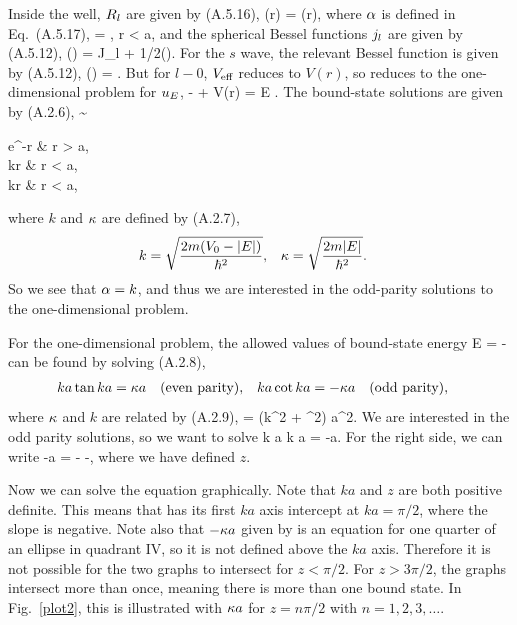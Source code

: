 \begin{solution}
	Inside the well, $R_l$ are given by (A.5.16),
	\beq
		\Rl(r) = \constant \jl(\alp r),
	\eeq
	where $\alpha$ is defined in Eq.~(A.5.17),
	\beq
		\alp = , \quad r < a,
	\eeq
	\clearpage
	and the spherical Bessel functions $j_l$ are given by (A.5.12),
	\beq
		\jl(\rho) = \sqrt{\frac{\pi}{2\rho}} J_{l + 1/2}(\rho).
	\eeq
	For the $s$ wave, the relevant Bessel function is given by (A.5.12),
	\beqn \label{jo}
		\jo(\rho) = \frac{\sin\rho}{\rho}.
	\eeqn
	But for $l - 0$, $V_{\text{eff}}$ reduces to $V(r)$, so  reduces to the one-dimensional problem for $u_E$,
	\beq
		-  + V(r) \uE = E \uE.
	\eeq
	The bound-state solutions are given by (A.2.6),
	\beqn \label{sols}
		\uE \sim \begin{cases}
			e^{-\kap r} &  r > a, \\
			\cos kr \quad {} &  r < a, \\
			\sin kr \quad {} & \text{for } r < a,
		\end{cases}
	\eeqn
	where $k$ and $\kappa$ are defined by (A.2.7),
	\begin{align*}
		k &= \sqrt{\frac{2m (V_0 - \abs{E})}{\hbar^2}}, &
		\kappa &= \sqrt{\frac{2m \abs{E}}{\hbar^2}}.
	\end{align*}
	So we see that $\alpha = k$, and thus we are interested in the odd-parity solutions to the one-dimensional problem.
	
	For the one-dimensional problem, the allowed values of bound-state energy
	\beq
		E = -\frac{\hbar^2 \kap^2}{2m}
	\eeq
	can be found by solving (A.2.8),
	\begin{align*}
		k a \tan k a &= \kappa a \quad\text{(even parity)}, &
		k a \cot k a &= -\kappa a \quad\text{(odd parity)},
	\end{align*}
	where $\kappa$ and $k$ are related by (A.2.9),
	\beq
		 = (k^2 + \kap^2) a^2.
	\eeq
	We are interested in the odd parity solutions, so we want to solve
	\beqn \label{ka}
		k a \cot k a = -\kap a.
	\eeqn
	For the right side, we can write
	\beqn \label{kapa}
		-\kap a = - \equiv -\sqrt{z^2 - (ka)^2},
	\eeqn
	where we have defined $z$.
	
	Now we can solve the equation graphically.  Note that $ka$ and $z$ are both positive definite. This means that  has its first $ka$ axis intercept at $ka = \pi/2$, where the slope is negative.  Note also that $-\kappa a$ given by  is an equation for one quarter of an ellipse in quadrant IV, so it is not defined above the $ka$ axis.  Therefore it is not possible for the two graphs to intersect for $z < \pi / 2$.  For $z > 3\pi / 2$, the graphs intersect more than once, meaning there is more than one bound state.  In Fig.~\ref{plot2}, this is illustrated with $\kappa a$ for $z = n \pi / 2$ with $n = 1, 2, 3, \ldots$.
	

\end{solution}
